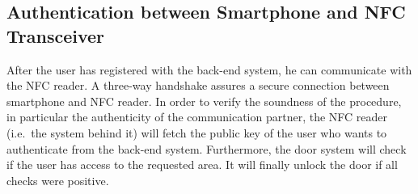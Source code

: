 \subsection{Authentication between Smartphone and NFC Transceiver}
After the user has registered with the back-end system, he can communicate with the NFC reader.
A three-way handshake assures a secure connection between smartphone and NFC reader.
In order to verify the soundness of the procedure, in particular the authenticity of the communication partner, the NFC reader (i.e.~the system behind it) will fetch the public key of the user who wants to authenticate from the back-end system.
Furthermore, the door system will check if the user has access to the requested area.
It will finally unlock the door if all checks were positive.

